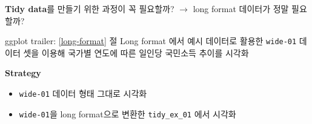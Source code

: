 \documentclass[
  11pt,
]{krantz}
\makeatletter
\providecommand{\tightlist}{%
  \setlength{\itemsep}{0pt}\setlength{\parskip}{0pt}}
\newenvironment{kframe}{%
\medskip{}
\setlength{\fboxsep}{.8em}
 \def\at@end@of@kframe{}%
 \ifinner\ifhmode%
  \def\at@end@of@kframe{\end{minipage}}%
  \begin{minipage}{\columnwidth}%
 \fi\fi%
 \def\FrameCommand##1{\hskip\@totalleftmargin \hskip-\fboxsep
 \colorbox{shadecolor}{##1}\hskip-\fboxsep
     \hskip-\linewidth \hskip-\@totalleftmargin \hskip\columnwidth}%
 \MakeFramed {\advance\hsize-\width
   \@totalleftmargin\z@ \linewidth\hsize
   \@setminipage}}%
 {\par\unskip\endMakeFramed%
 \at@end@of@kframe}
\renewenvironment{quote}{\begin{kframe}}{\end{kframe}}
\makeatother
\begin{document}
\normalsize

\textbf{Tidy data}를 만들기 위한 과정이 꼭 필요할까? \(\rightarrow\) long format 데이터가 정말 필요할까?

\begin{quote}
ggplot trailer: \ref{long-format} 절 Long format 에서 예시 데이터로 활용한 \texttt{wide-01} 데이터 셋을 이용해 국가별 연도에 따른 일인당 국민소득 추이를 시각화

\textbf{Strategy}

\begin{itemize}
\tightlist
\item
  \texttt{wide-01} 데이터 형태 그대로 시각화
\item
  \texttt{wide-01}을 long format으로 변환한 \texttt{tidy\_ex\_01} 에서 시각화
\end{itemize}
\end{quote}

\footnotesize
\end{document}
